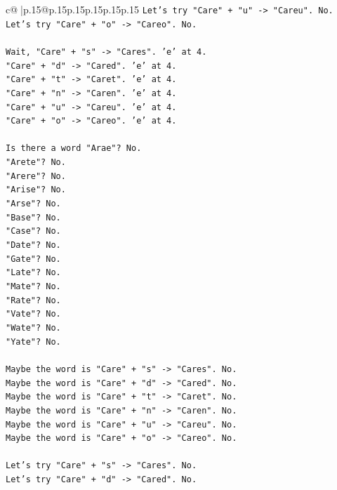 \documentclass{article}
\begin{document}
{\begin{supertabular}{c@{$\;$}|p{.15\linewidth}@{}p{.15\linewidth}p{.15\linewidth}p{.15\linewidth}p{.15\linewidth}p{.15\linewidth}}
{{{\texttt{Let's try "Care" + "u" {-}> "Careu". No.} \\
\texttt{Let's try "Care" + "o" {-}> "Careo". No.} \\
\\ 
\texttt{Wait, "Care" + "s" {-}> "Cares". 'e' at 4.} \\
\texttt{"Care" + "d" {-}> "Cared". 'e' at 4.} \\
\texttt{"Care" + "t" {-}> "Caret". 'e' at 4.} \\
\texttt{"Care" + "n" {-}> "Caren". 'e' at 4.} \\
\texttt{"Care" + "u" {-}> "Careu". 'e' at 4.} \\
\texttt{"Care" + "o" {-}> "Careo". 'e' at 4.} \\
\\ 
\texttt{Is there a word "Arae"? No.} \\
\texttt{"Arete"? No.} \\
\texttt{"Arere"? No.} \\
\texttt{"Arise"? No.} \\
\texttt{"Arse"? No.} \\
\texttt{"Base"? No.} \\
\texttt{"Case"? No.} \\
\texttt{"Date"? No.} \\
\texttt{"Gate"? No.} \\
\texttt{"Late"? No.} \\
\texttt{"Mate"? No.} \\
\texttt{"Rate"? No.} \\
\texttt{"Vate"? No.} \\
\texttt{"Wate"? No.} \\
\texttt{"Yate"? No.} \\
\\ 
\texttt{Maybe the word is "Care" + "s" {-}> "Cares". No.} \\
\texttt{Maybe the word is "Care" + "d" {-}> "Cared". No.} \\
\texttt{Maybe the word is "Care" + "t" {-}> "Caret". No.} \\
\texttt{Maybe the word is "Care" + "n" {-}> "Caren". No.} \\
\texttt{Maybe the word is "Care" + "u" {-}> "Careu". No.} \\
\texttt{Maybe the word is "Care" + "o" {-}> "Careo". No.} \\
\\ 
\texttt{Let's try "Care" + "s" {-}> "Cares". No.} \\
\texttt{Let's try "Care" + "d" {-}> "Cared". No.} \\
}}}
\end{supertabular}}
\end{document}
